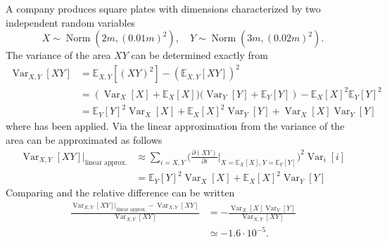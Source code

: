 \begin{example}
	A company produces square plates with dimensions characterized by two independent random variables
	\begin{equation}
		X\sim \operatorname{Norm}(2m,(0.01m)^2), \quad Y\sim \operatorname{Norm}(3m,(0.02m)^2).
	\end{equation} 
	The variance of the area $XY$ can be determined exactly from 
	\begin{equation}
		\label{eq:var1}
		\begin{split}
			\operatorname{Var}_{X,Y}[XY]&=\mathbb{E}_{X,Y}[(XY)^2]-(\mathbb{E}_{X,Y}[XY])^2\\
			&=(\operatorname{Var}_X[X]+\mathbb{E}_X[X]\bigg)\bigg(\operatorname{Var}_Y[Y]+\mathbb{E}_Y[Y])-\mathbb{E}_X[X]^2\mathbb{E}_Y[Y]^2\\
			&=\mathbb{E}_Y[Y]^2\operatorname{Var}_X[X]+\mathbb{E}_X[X]^2\operatorname{Var}_Y[Y]+\operatorname{Var}_X[X]\operatorname{Var}_Y[Y]
		\end{split}
	\end{equation}
	where  has been applied.	Via the linear approximation from  the variance of the area can be approximated as follows
	\begin{equation}
		\label{eq:var2}
		\begin{split}
			\operatorname{Var}_{X,Y}[XY]|_{\text{linear approx.}}&\approx\sum_{i = X,Y} \bigg( \frac{\partial (XY)}{\partial i}\bigg|_{X = \mathbb{E}_X[X],Y = \mathbb{E}_Y[Y]}  \bigg)^2\operatorname{Var}_i[i]\\
			&=\mathbb{E}_Y[Y]^2\operatorname{Var}_X[X]+\mathbb{E}_X[X]^2\operatorname{Var}_Y[Y]
		\end{split}
	\end{equation}
	Comparing  and  the relative difference can be written
	\begin{equation}
		\begin{split}
			\frac{\operatorname{Var}_{X,Y}[XY]|_{\text{linear approx.}}-\operatorname{Var}_{X,Y}[XY]}{\operatorname{Var}_{X,Y}[XY]} &= -\frac{\operatorname{Var}_X[X]\operatorname{Var}_Y[Y]}{\operatorname{Var}_{X,Y}[XY]}\\
			& \simeq -1.6\cdot 10^{-5}.
		\end{split}
	\end{equation}
	
\end{example}

